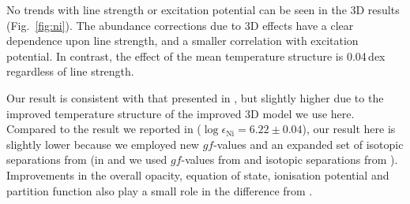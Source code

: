 \documentclass[traditabstract]{aa}
\begin{document}
No trends with line strength or excitation potential can be seen in the 3D results (Fig.~\ref{fig:ni}).  The abundance corrections due to 3D effects have a clear dependence upon line strength, and a smaller correlation with excitation potential.  In contrast, the effect of the mean temperature structure is 0.04\,dex regardless of line strength.

Our result is consistent with that presented in \citet[][$\log \epsilon_\mathrm{Ni}=6.17\pm0.05$]{Scott09Ni}, but slightly higher due to the improved temperature structure of the improved 3D model we use here.  Compared to the result we reported in  ($\log \epsilon_\mathrm{Ni}=6.22\pm0.04$), our result here is slightly lower because we employed new $gf$-values and an expanded set of isotopic separations from \citet{Wood14} (in  and \citealt{Scott09Ni} we used $gf$-values from \citealt{Wickliffe97} and isotopic separations from \citealt{Litzen93}).  Improvements in the overall opacity, equation of state, ionisation potential and partition function also play a small role in the difference from .

\setcounter{table}{3}
	
\end{document}
